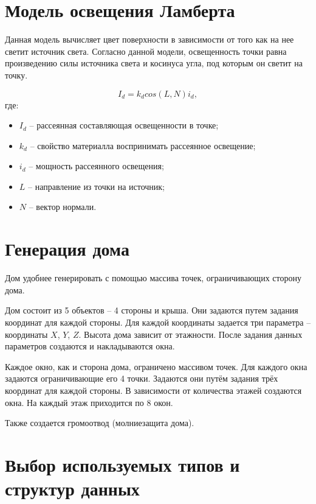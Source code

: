 

\section{Модель освещения Ламберта}

Данная модель вычисляет цвет поверхности в зависимости от того как на нее светит источник света. Согласно данной модели, освещенность точки равна произведению силы источника света и косинуса угла, под которым он светит на точку.

\begin{equation}
	\label{eq:lambert}
	I_{d} = k_{d}  cos(L, N)  i_{d},
\end{equation}
где:
\begin{itemize}
	\item $I_{d}$ -- рассеянная составляющая освещенности в точке;
	\item $k_{d}$ -- свойство материалла воспринимать рассеянное освещение;
	\item $i_{d}$ -- мощность рассеянного освещения;
	\item $L$ -- направление из точки на источник;
	\item $N$ -- вектор нормали.
\end{itemize}

\section{Генерация дома}
Дом удобнее генерировать с помощью массива точек, ограничивающих сторону дома.

Дом состоит из 5 объектов – 4 стороны и крыша. Они задаются путем задания координат для каждой стороны. Для каждой координаты задается три параметра – координаты $X$, $Y$, $Z$. Высота дома зависит от этажности. После задания данных параметров создаются и накладываются окна. 

Каждое окно, как и сторона дома, ограничено массивом точек. Для каждого окна задаются ограничивающие его 4 точки. Задаются они путём задания трёх координат для каждой стороны. В зависимости от количества этажей создаются окна. На каждый этаж приходится по 8 окон. 

Также создается громоотвод (молниезащита дома). 

\section{Выбор используемых типов и структур данных}

